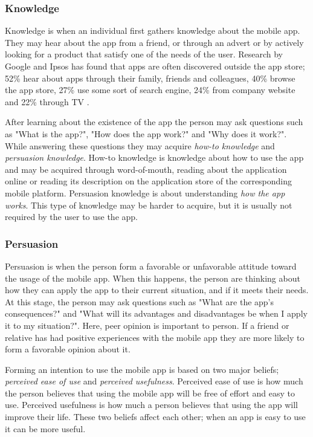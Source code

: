 \subsubsection{Knowledge}

Knowledge is when an individual first gathers knowledge about the mobile app. They may hear about the app from a friend, or through an advert or by actively looking for a product that satisfy one of the needs of the user. Research by Google and Ipsos has found that apps are often discovered outside the app store; 52\% hear about apps through their family, friends and colleagues, 40\% browse the app store, 27\% use some sort of search engine, 24\% from company website and 22\% through TV \cite{Tiongson2015}.

After learning about the existence of the app the person may ask questions such as "What is the app?", "How does the app work?" and "Why does it work?". While answering these questions they may acquire \textit{how-to knowledge} and \textit{persuasion knowledge}. How-to knowledge is knowledge about how to use the app and may be acquired through word-of-mouth, reading about the application online or reading its description on the application store of the corresponding mobile platform. Persuasion knowledge is about understanding \textit{how the app works}. This type of knowledge may be harder to acquire, but it is usually not required by the user to use the app.

\subsubsection{Persuasion}

Persuasion is when the person form a favorable or unfavorable attitude toward the usage of the  mobile app. When this happens, the person are thinking about how they can apply the app to their current situation, and if it meets their needs. At this stage, the person may ask questions such as "What are the app's consequences?" and "What will its advantages and disadvantages be when I apply it to my situation?". Here, peer opinion is important to person. If a friend or relative has had positive experiences with the mobile app they are more likely to form a favorable opinion about it.

Forming an intention to use the mobile app is based on two major beliefs; \textit{perceived ease of use} and \textit{perceived usefulness}. Perceived ease of use is how much the person believes that using the mobile app will be free of effort and easy to use. Perceived usefulness is how much a person believes that using the app will improve their life. These two beliefs affect each other; when an app is easy to use it can be more useful.

